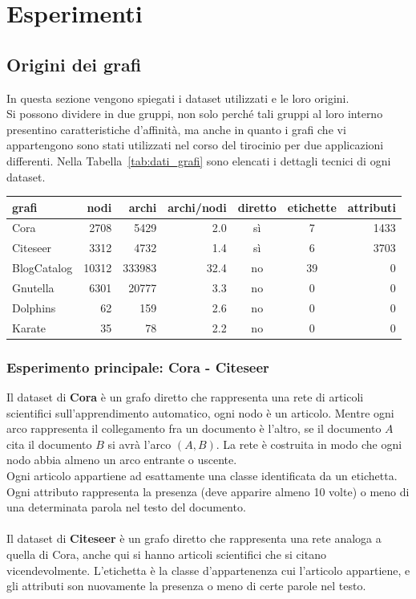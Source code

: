 
%
\chapter{Esperimenti}
\section{Origini dei grafi}
In questa sezione vengono spiegati i dataset utilizzati e le loro origini.\\
Si possono dividere in due gruppi, non solo perché tali gruppi al loro interno presentino caratteristiche d'affinità, ma anche in quanto i grafi che vi appartengono sono stati utilizzati nel corso del tirocinio per due applicazioni differenti. Nella Tabella~\ref{tab:dati_grafi} sono elencati i dettagli tecnici di ogni dataset.
%
\begin{center}
	\begin{tabular}{|l|r|r|r|c|c|r|}
		\hline
		grafi&nodi&archi&archi/nodi&diretto&etichette&attributi\\
		\hline
		Cora & 2708 & 5429 & 2.0 & sì & 7 & 1433\\
		Citeseer & 3312 & 4732 & 1.4 & sì & 6 & 3703\\
		\hline
		BlogCatalog & 10312 & 333983 & 32.4 & no & 39 & 0\\
		Gnutella & 6301 & 20777 & 3.3 & no & 0 & 0\\
		Dolphins & 62 & 159 & 2.6 & no & 0 & 0\\
		Karate & 35 & 78 & 2.2 & no & 0 & 0\\
		\hline
		\end{tabular}
		\label{tab:dati_grafi}
\end{center}
%
\subsection*{Esperimento principale: Cora - Citeseer}\cite{Co-Ci_1}\cite{Co-Ci_2}
Il dataset di \textbf{Cora} è un grafo diretto che rappresenta una rete di articoli scientifici sull'apprendimento automatico, ogni nodo è un articolo. Mentre ogni arco rappresenta il collegamento fra un documento è l'altro, se il documento $A$ cita il documento $B$ si avrà l'arco $(A, B)$. La rete è costruita in modo che ogni nodo abbia almeno un arco entrante o uscente.\\
Ogni articolo appartiene ad esattamente una classe identificata da un etichetta. Ogni attributo rappresenta la presenza (deve apparire almeno 10 volte) o meno di una determinata parola nel testo del documento.\\
\\
Il dataset di \textbf{Citeseer} è un grafo diretto che rappresenta una rete analoga a quella di Cora, anche qui si hanno articoli scientifici che si citano vicendevolmente. L'etichetta è la classe d'appartenenza cui l'articolo appartiene, e gli attributi son nuovamente la presenza o meno di certe parole nel testo.\\
%
